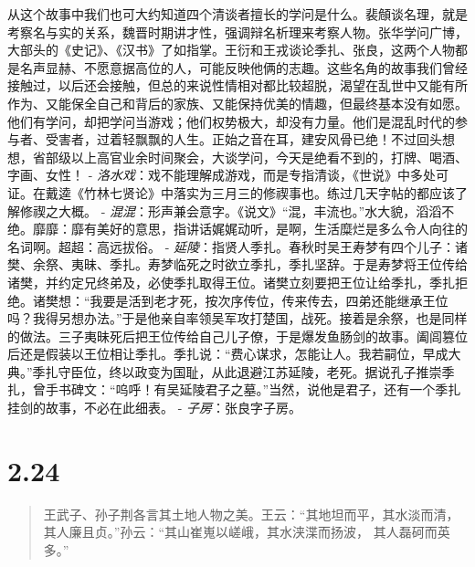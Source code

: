 \documentclass[]{book}
\begin{document}
从这个故事中我们也可大约知道四个清谈者擅长的学问是什么。裴頠谈名理，就是考察名与实的关系，魏晋时期讲才性，强调辩名析理来考察人物。张华学问广博，大部头的《史记》、《汉书》了如指掌。王衍和王戎谈论季扎、张良，这两个人物都是名声显赫、不愿意据高位的人，可能反映他俩的志趣。这些名角的故事我们曾经接触过，以后还会接触，但总的来说性情相对都比较超脱，渴望在乱世中又能有所作为、又能保全自己和背后的家族、又能保持优美的情趣，但最终基本没有如愿。他们有学问，却把学问当游戏；他们权势极大，却没有力量。他们是混乱时代的参与者、受害者，过着轻飘飘的人生。正始之音在耳，建安风骨已绝！不过回头想想，省部级以上高官业余时间聚会，大谈学问，今天是绝看不到的，打牌、喝酒、字画、女性！
-
\emph{洛水戏}：戏不能理解成游戏，而是专指清谈，《世说》中多处可证。在戴逵《竹林七贤论》中落实为三月三的修禊事也。练过几天字帖的都应该了解修禊之大概。
-
\emph{混混}：形声兼会意字。《说文》``混，丰流也。''水大貌，滔滔不绝。靡靡：靡有美好的意思，指讲话娓娓动听，是啊，生活糜烂是多么令人向往的名词啊。超超：高远拔俗。
-
\emph{延陵}：指贤人季扎。春秋时吴王寿梦有四个儿子：诸樊、余祭、夷昧、季扎。寿梦临死之时欲立季扎，季扎坚辞。于是寿梦将王位传给诸樊，并约定兄终弟及，必使季扎取得王位。诸樊立刻要把王位让给季扎，季扎拒绝。诸樊想：``我要是活到老才死，按次序传位，传来传去，四弟还能继承王位吗？我得另想办法。''于是他亲自率领吴军攻打楚国，战死。接着是余祭，也是同样的做法。三子夷昧死后把王位传给自己儿子僚，于是爆发鱼肠剑的故事。阖闾篡位后还是假装以王位相让季扎。季扎说：``费心谋求，怎能让人。我若嗣位，早成大典。''季扎守臣位，终以政变为国耻，从此退避江苏延陵，老死。据说孔子推崇季扎，曾手书碑文：``呜呼！有吴延陵君子之墓。''当然，说他是君子，还有一个季扎挂剑的故事，不必在此细表。
- \emph{子房}：张良字子房。

\section{2.24}\label{section-70}

\begin{quote}
王武子、孙子荆各言其土地人物之美。王云：``其地坦而平，其水淡而清，其人廉且贞。''孙云：``其山崔嵬以嵯峨，其水浃渫而扬波，
其人磊砢而英多。''
\end{quote}
\end{document}
